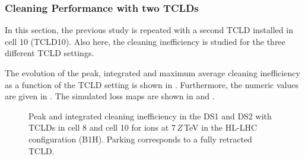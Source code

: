 \subsubsection{Cleaning Performance with two TCLDs}



In this section, the previous study is repeated with a second TCLD installed in cell 10 (TCLD10). Also here, the cleaning inefficiency is studied for the three different TCLD settings. 

The evolution of the peak, integrated and maximum average cleaning inefficiency as a function of the TCLD setting is shown in . Furthermore, the numeric values are given in . The simulated loss maps are shown in  and . 



\begin{figure}[b]
  \centering
  \caption{Peak and integrated cleaning inefficiency in the DS1 and DS2 with TCLDs in cell 8 and cell 10 for \lead ions at 7$\,Z\,$TeV in the HL-LHC configuration (B1H). Parking corresponds to a fully retracted TCLD.}  
  \label{pic:16081603}
  \end{figure}



